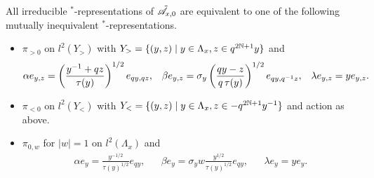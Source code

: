\begin{Lem} All irreducible $^*$-representations of $\tilde{\mathscr{A}}_{x,0}$ are equivalent to one of the following mutually inequivalent $^*$-representations.
\begin{itemize} 
\item $\pi_{>0}$ on $l^2(Y_>)$ with $Y_> = \{(y,z)\mid y\in \Lambda_x,z\in q^{2\mathbb{N}+1}y\}$ and  \begin{align*} \alpha e_{y,z} =  \left(\frac{y^{-1}+qz}{\operatorname{\tau}(y)}\right)^{1/2}e_{qy,qz}, && \beta e_{y,z} = \sigma_y \left(\frac{qy-z}{q\operatorname{\tau}(y)}\right)^{1/2}e_{qy,q^{-1}z},&& \lambda e_{y,z} = ye_{y,z}.\end{align*}
\item $\pi_{<0}$ on $l^2(Y_<)$ with $Y_< = \{(y,z)\mid y\in \Lambda_x,z \in -q^{2\mathbb{N}+1}y^{-1}\}$ and action as above.
\item $\pi_{0,w}$ for $|w| = 1$ on $l^2(\Lambda_x)$ and \begin{align*} \alpha e_y = \frac{y^{-1/2}}{\tau(y)^{1/2}}e_{qy},&& \beta e_y = \sigma_y w\frac{y^{1/2}}{\tau(y)^{1/2}}e_{qy},&& \lambda e_{y} = ye_y.\end{align*}
\end{itemize}

\end{Lem}

